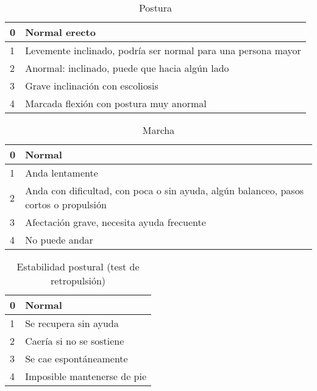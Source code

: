 \begin{table}[H]
\begin{center}
\begin{tabular}{|p{1cm}|p{11cm}|}
\hline
0 & Normal erecto \\\hline
1 & Levemente inclinado, podría ser normal para una persona mayor \\\hline
2 & Anormal: inclinado, puede que hacia algún lado\\\hline
3 & Grave inclinación con escoliosis \\\hline
4 & Marcada flexión con postura muy anormal\\\hline
\end{tabular}
\caption{Postura}
\end{center}
\end{table}


\begin{table}[H]
\begin{center}
\begin{tabular}{|p{1cm}|p{11cm}|}
\hline
0 & Normal \\\hline
1 & Anda lentamente \\\hline
2 & Anda con dificultad, con poca o sin ayuda, algún balanceo, pasos cortos o propulsión \\\hline
3 & Afectación grave, necesita ayuda frecuente \\\hline
4 & No puede andar\\\hline
\end{tabular}
\caption{Marcha}
\end{center}
\end{table}

\begin{table}[H]
\begin{center}
\begin{tabular}{|p{1cm}|p{11cm}|}
\hline
0 & Normal \\\hline
1 & Se recupera sin ayuda \\\hline
2 & Caería si no se sostiene\\\hline
3 & Se cae espontáneamente \\\hline
4 & Imposible mantenerse de pie\\\hline
\end{tabular}
\caption{Estabilidad postural (test de retropulsión)}
\end{center}
\end{table}

